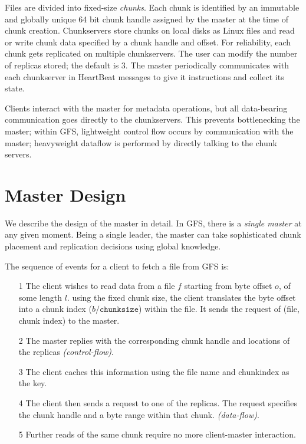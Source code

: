 \documentclass{article}
\begin{document}
Files are divided into fixed-size \emph{chunks}. Each chunk is identified by an
immutable and globally unique 64 bit chunk handle assigned by the master at the
time of chunk creation.  Chunkservers store chunks on local disks as Linux files
and read or write chunk data specified by a chunk handle and offset. For
reliability, each chunk gets replicated on multiple chunkservers. The user
can modify the number of replicas stored; the default is 3. The master
periodically communicates with each chunkserver in HeartBeat messages to give
it instructions and collect its state.


Clients interact with the master for metadata operations, but all data-bearing
communication goes directly to the chunkservers. This prevents bottlenecking
the master; within GFS, lightweight control flow occurs by communication with
the master; heavyweight dataflow is performed by directly talking to the
chunk servers.

\section{Master Design}

We describe the design of the master in detail. In GFS, there
is a \emph{single master} at any given moment. Being a single leader, the
master can take sophisticated chunk placement and replication decisions using
global knowledge. 

The sequence of events for a client to fetch a file from GFS is:
\begin{itemize}
    \item[1]  The client wishes to read data from a file $f$ starting from byte offset $o$, of
        some length $l$. using the fixed chunk size, the client translates the
        byte offset into a chunk index ($b/\texttt{chunksize}$) within the file.
        It sends the request of (file, chunk index) to the master.
    \item[2]  The master replies with the corresponding chunk handle and
        locations of the replicas \emph{(control-flow)}.
    \item[3] The client caches this information using the file name and
        chunkindex as the key.
    \item[4] The client then sends a request to one of the replicas.
        The request specifies the chunk handle and a byte range within that
        chunk. \emph{(data-flow)}.
    \item[5] Further reads of the same chunk require no more client-master
        interaction.
\end{itemize}
\end{document}
